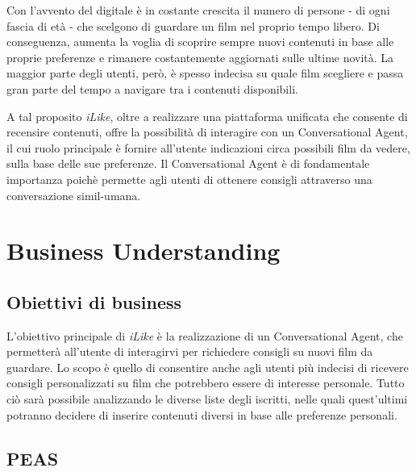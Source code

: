\documentclass[a4paper, 10pt]{report}
\begin{document}
        Con l'avvento del digitale è in costante crescita il numero di persone - di ogni fascia di età - che scelgono
        di guardare un film nel proprio tempo libero. Di conseguenza, aumenta la voglia di scoprire sempre nuovi contenuti
        in base alle proprie preferenze e rimanere costantemente aggiornati sulle ultime novità. La maggior parte degli utenti,
        però, è spesso indecisa su quale film scegliere e passa gran parte del tempo a navigare tra i contenuti disponibili.

        A tal proposito \textit{iLike}, oltre a realizzare una piattaforma unificata che consente di recensire contenuti, offre
        la possibilità di interagire con un Conversational Agent, il cui ruolo principale è fornire all'utente indicazioni circa possibili
        film da vedere, sulla base delle sue preferenze.
        Il Conversational Agent è di fondamentale importanza poichè permette agli utenti di ottenere consigli attraverso una
        conversazione simil-umana.


    \chapter{Business Understanding}\label{ch:business-understanding}

        \section{Obiettivi di business}\label{sec:obiettivi-di-business}

            L'obiettivo principale di \textit{iLike} è la realizzazione di un Conversational Agent, che permetterà all'utente di
            interagirvi per richiedere consigli su nuovi film da guardare. Lo scopo è quello di consentire anche agli utenti più indecisi
            di ricevere consigli personalizzati su film che potrebbero essere di interesse personale.
            Tutto ciò sarà possibile analizzando le diverse liste degli iscritti, nelle quali quest'ultimi potranno decidere di inserire contenuti
            diversi in base alle preferenze personali.

        \section{PEAS}\label{sec:peas}
\end{document}
